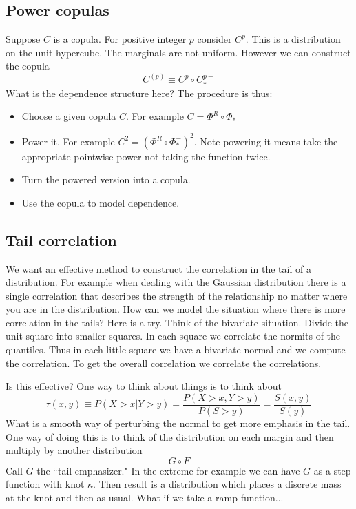 \documentclass[a4paper,12pt]{article}
\begin{document}
\subsection*{Power copulas}

Suppose $C$ is a copula.  For positive integer $p$ consider $C^p$.  This is a distribution on the unit hypercube.   The marginals are not uniform.   However we can construct the copula
$$
C^{(p)}\equiv C^p\circ C^{p-}_*
$$
What is the dependence structure here?  The procedure is thus:
\begin{itemize}
    \item Choose a given copula $C$.  For example $C=\Phi^R\circ\Phi_*^-$
    \item Power it.  For example $C^2=(\Phi^R\circ\Phi_*^-)^2$.  Note powering it means take the appropriate pointwise power not taking the function twice.
    \item Turn the powered version into a copula.
    \item Use the copula to model dependence.
\end{itemize}

\subsection*{Tail correlation}

We want an effective method to construct the correlation in the tail of  a distribution.   For example when dealing with the Gaussian distribution there is a single correlation that describes the strength of the relationship no matter where you are in the distribution.  How can we model the situation where there is more correlation in the tails?  Here is a try.  Think of the bivariate situation.  Divide the unit square into smaller squares.  In each square we correlate the normits of the quantiles.  Thus in each little square we have a bivariate normal and we compute the correlation.   To get the overall correlation we correlate the correlations.

Is this effective?  One way to think about things is to think about
$$
\tau(x,y)\equiv P(X>x|Y>y) = \frac{P(X>x,Y>y)}{P(S>y)}= \frac{S(x,y)}{S(y)}
$$
What is a smooth way of perturbing the normal to get more emphasis in the tail.  One way of doing this is to think of the distribution on each margin and then multiply by another distribution
$$
G\circ F
$$
Call $G$ the ``tail emphasizer."  In the extreme for example we can have $G$ as a step function with knot $\kappa$. Then result is a distribution which places a discrete mass at the knot and then as usual.  What if we take a ramp function...
\end{document}
